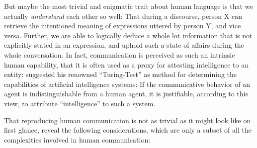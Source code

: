 
But maybe the most trivial and enigmatic trait about human language is that we actually
\emph{understand} each other so well: That during a discourse, person X can
retrieve the intentioned meaning of expressions uttered by person Y, and
vice versa. Further, we are able to logically deduce a whole lot information
that is not explicitly stated in an expression, and uphold such a state of
affairs during the whole conversation. In fact, communication is perceived
as such an intrinsic human capability, that it is often used as a proxy for
attesting intelligence to an entity: \cite{turing1950computing} suggested
his renowned ``Turing-Test'' as method for determining the capabilities of
artificial intelligence systems: If the communicative behavior of an agent
is indistinguishable from a human agent, it is justifiable, according to
this view, to attribute ``intelligence'' to such a system.


That reproducing human communication is not as trivial as it might look like on first glance,
reveal the following considerations, which are only a subset of all the complexities involved
in human communication:

